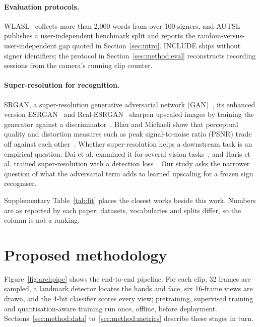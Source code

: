 \documentclass[pdflatex,sn-mathphys-num,twocolumn,lineno]{sn-jnl}
\theoremstyle{thmstyleone}%
\begin{document}
\paragraph{Evaluation protocols.} WLASL~\cite{li2020wlasl} collects more than 2,000 words from over 100 signers, and AUTSL~\cite{sincan2020autsl} publishes a user-independent benchmark split and reports the random-versus-user-independent gap quoted in Section~\ref{sec:intro}. INCLUDE ships without signer identifiers; the protocol in Section~\ref{sec:method:eval} reconstructs recording sessions from the camera's running clip counter.

\paragraph{Super-resolution for recognition.} SRGAN, a super-resolution generative adversarial network (GAN)~\cite{ledig2017srgan}, its enhanced version ESRGAN~\cite{wang2018esrgan} and Real-ESRGAN~\cite{wang2021realesrgan} sharpen upscaled images by training the generator against a discriminator~\cite{goodfellow2014gan}. Blau and Michaeli show that perceptual quality and distortion measures such as peak signal-to-noise ratio (PSNR) trade off against each other~\cite{blau2018pd}. Whether super-resolution helps a downstream task is an empirical question: Dai et al. examined it for several vision tasks~\cite{dai2016srhelpful}, and Haris et al. trained super-resolution with a detection loss~\cite{haris2018taskdriven}. Our study asks the narrower question of what the adversarial term adds to learned upscaling for a frozen sign recogniser.

Supplementary Table~\ref{tab:lit} places the closest works beside this work. Numbers are as reported by each paper; datasets, vocabularies and splits differ, so the column is not a ranking.

\section{Proposed methodology}\label{sec:method}
Figure~\ref{fig:archpipe} shows the end-to-end pipeline. For each clip, 32 frames are sampled, a landmark detector locates the hands and face, six 16-frame views are drawn, and the 4-bit classifier scores every view; pretraining, supervised training and quantisation-aware training run once, offline, before deployment. Sections~\ref{sec:method:data} to~\ref{sec:method:metrics} describe these stages in turn.
\end{document}
